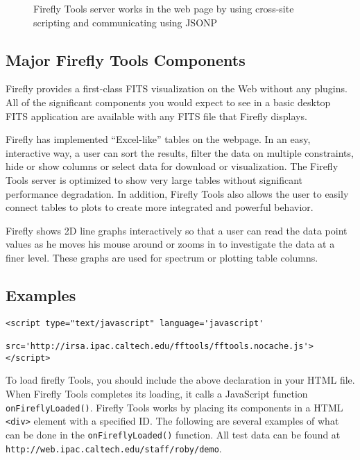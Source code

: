 \begin{figure}[!ht]
\caption{\small Firefly Tools server works in the web page by using cross-site scripting and communicating using JSONP}
\label{server-chart}
\end{figure}


\subsection{Major Firefly Tools Components}

Firefly provides a first-class FITS visualization on the Web without any plugins. All of the significant components you would expect to see in a basic desktop FITS application are available with any FITS file that Firefly displays.

Firefly has implemented “Excel-like” tables on the webpage. In an easy, interactive way, a user can sort the results, filter the data on multiple constraints, hide or show columns or select data for download or visualization. The Firefly Tools server is optimized to show very large tables without significant performance degradation. In addition, Firefly Tools also allows the user to easily connect tables to plots to create more integrated and powerful behavior.

Firefly shows 2D line graphs interactively so that a user can read the data point values as he moves his mouse around or zooms in to investigate the data at a finer level. These graphs are used for spectrum or plotting table columns. 


\subsection{Examples}

\scriptsize
\begin{verbatim}
<script type="text/javascript" language='javascript'
           src='http://irsa.ipac.caltech.edu/fftools/fftools.nocache.js'> </script>
\end{verbatim}
\normalsize
To load firefly Tools, you should include the above declaration in your HTML file. When Firefly Tools completes its loading, it calls a JavaScript function \scriptsize \texttt{onFireflyLoaded()}\normalsize. Firefly Tools works by placing its components in a HTML \scriptsize\texttt{<div>} \normalsize element with a specified ID. The following are several examples of what can be done in the \scriptsize \texttt{onFireflyLoaded()} \normalsize function. All test data can be found at \texttt{http://web.ipac.caltech.edu/staff/roby/demo}.

